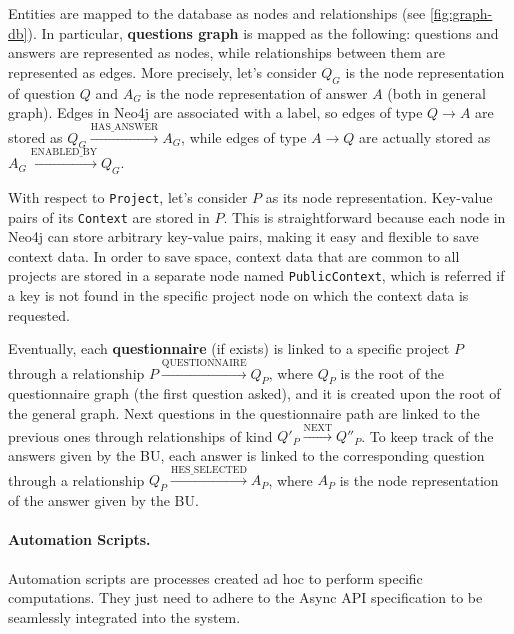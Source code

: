 \documentclass[12pt,a4paper,openright,twoside]{book}
\begin{document}
Entities are mapped to the database as nodes and relationships (see \cref{fig:graph-db}).
%
In particular, \textbf{questions graph} is mapped as the following: questions and answers are represented as nodes, while relationships between them are represented as edges.
%
More precisely, let's consider $Q_G$ is the node representation of question $Q$ and $A_G$ is the node representation of answer $A$ (both in general graph).
%
Edges in Neo4j are associated with a label, so edges of type $Q \to A$ are stored as $Q_G \xrightarrow{\text{HAS\_ANSWER}} A_G$, while edges of type $A \to Q$ are actually stored as $A_G \xrightarrow{\text{ENABLED\_BY}} Q_G$.


With respect to \texttt{Project}, let's consider $P$ as its node representation.
%
Key-value pairs of its \texttt{Context} are stored in $P$.
%
This is straightforward because each node in Neo4j can store arbitrary key-value pairs, making it easy and flexible to save context data.
%
In order to save space, context data that are common to all projects are stored in a separate node named \texttt{PublicContext}, which is referred if a key is not found in the specific project node on which the context data is requested.

Eventually, each \textbf{questionnaire} (if exists) is linked to a specific project $P$ through a relationship $P \xrightarrow{\text{QUESTIONNAIRE}} Q_P$, where $Q_P$ is the root of the questionnaire graph (the first question asked), and it is created upon the root of the general graph.
%
Next questions in the questionnaire path are linked to the previous ones through relationships of kind $Q'_P \xrightarrow{\text{NEXT}} Q''_P$.
%
To keep track of the answers given by the \ac{BU}, each answer is linked to the corresponding question through a relationship $Q_P \xrightarrow{\text{HES\_SELECTED}} A_P$, where $A_P$ is the node representation of the answer given by the \ac{BU}.

\paragraph{Automation Scripts.}

Automation scripts are processes created ad hoc to perform specific computations.
%
They just need to adhere to the Async API specification to be seamlessly integrated into the system.
%
\end{document}
